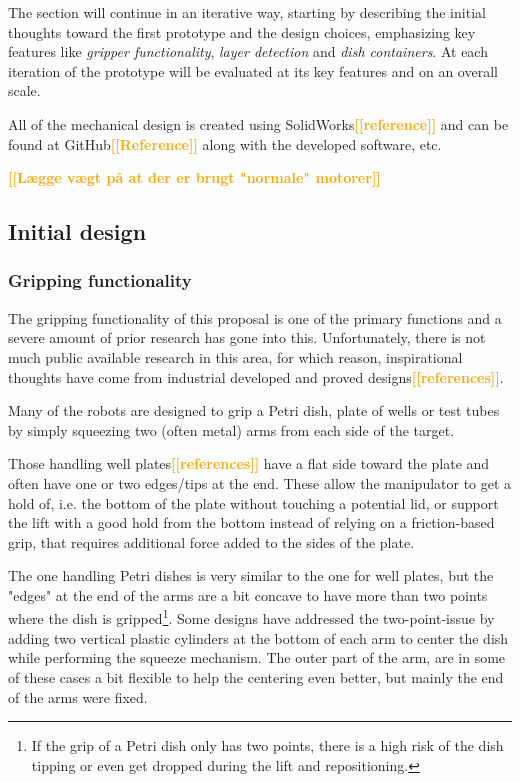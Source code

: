 \documentclass{sigchi}
\newcommand{\todo}[1]{\textsf{\textbf{\textcolor{Orange}{[[#1]]}}}}
\begin{document}
	The section will continue in an iterative way, starting by describing the initial thoughts toward the first prototype and the design choices, emphasizing key features like \textit{gripper functionality}, \textit{layer detection} and \textit{dish containers}. At each iteration of the prototype will be evaluated at its key features and on an overall scale.
	
	All of the mechanical design is created using SolidWorks\todo{reference} and can be found at GitHub\todo{Reference} along with the developed software, etc.
	
	\todo{Lægge vægt på at der er brugt "normale" motorer}			
			
	
	\subsection{Initial design}
	\subsubsection{Gripping functionality}	
	The gripping functionality of this proposal is one of the primary functions and a severe amount of prior research has gone into this. Unfortunately, there is not much public available research in this area, for which reason, inspirational thoughts have come from industrial developed and proved designs\todo{references}.
	
	Many of the robots are designed to grip a Petri dish, plate of wells or test tubes by simply squeezing two (often metal) arms from each side of the target.
	
	Those handling well plates\todo{references} have a flat side toward the plate and often have one or two edges/tips at the end. These allow the manipulator to get a hold of, i.e. the bottom of the plate without touching a potential lid, or support the lift with a good hold from the bottom instead of relying on a friction-based grip, that requires additional force added to the sides of the plate. 
	
	The one handling Petri dishes is very similar to the one for well plates, but the "edges" at the end of the arms are a bit concave to have more than two points where the dish is gripped\footnote{If the grip of a Petri dish only has two points, there is a high risk of the dish tipping or even get dropped during the lift and repositioning.}. Some designs have addressed the two-point-issue by adding two vertical plastic cylinders at the bottom of each arm to center the dish while performing the squeeze mechanism. The outer part of the arm, are in some of these cases a bit flexible to help the centering even better, but mainly the end of the arms were fixed.
	
\end{document}

